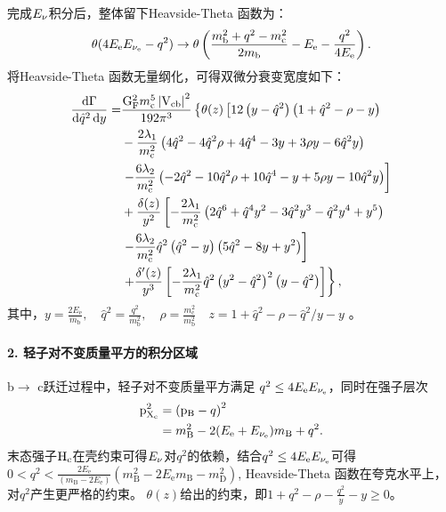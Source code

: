完成$E_{\mathrm{\nu}}$积分后，整体留下Heavside-Theta 函数为：
\begin{equation}
    \theta(4 E_{\mathrm{e}} E_{\mathrm{\nu_{e}}} - q^2) \rightarrow \theta\left(\frac{m_{\mathrm{b}}^2 + q^2 - m_{\mathrm{c}}^2}{2 m_{\mathrm{b}}} - E_{\mathrm{e}} - \frac{q^2}{4 E_{\mathrm{e}}}\right).
\end{equation}
将Heavside-Theta 函数无量纲化，可得双微分衰变宽度如下：
\begin{equation}
    \begin{aligned}
    \frac{\mathrm{d} \Gamma}{\mathrm{d} \hat{q}^2 \, \mathrm{d} y} = & \frac{\mathrm{G_F^2}m_{\mathrm{c}}^5 \left| \mathrm{V_{\mathrm{cb}}} \right|^2}{192 \pi^3}\left\{ \theta ( z ) \left[ 12 \left( y - \hat{q}^2 \right) \left( 1 + \hat{q}^2 - \rho - y \right) \right. \right. \\
    & - \frac{2 \lambda_1}{m_{\mathrm{c}}^2} \left( 4 \hat{q}^2 - 4 \hat{q}^2 \rho + 4 \hat{q}^4 - 3 y + 3 \rho y - 6 \hat{q}^2 y \right) \\
    & \left. - \frac{6 \lambda_2}{m_{\mathrm{c}}^2} \left( - 2 \hat{q}^2 - 10 \hat{q}^2 \rho + 10 \hat{q}^4 - y + 5 \rho y - 10 \hat{q}^2 y \right) \right] \\
    & + \frac{\delta(z)}{y^2} \left[ - \frac{2 \lambda_1}{m_{\mathrm{c}}^2} \left( 2 \hat{q}^6 + \hat{q}^4 y^2 - 3 \hat{q}^2 y^3 - \hat{q}^2 y^4 + y^5 \right) \right. \\
    & \left. - \frac{6 \lambda_2}{m_{\mathrm{c}}^2} \hat{q}^2 \left( \hat{q}^2 - y \right) \left( 5 \hat{q}^2 - 8 y + y^2 \right) \right] \\
    & \left. + \frac{\delta^{\prime}(z)}{y^3} \left[ - \frac{2 \lambda_1}{m_{\mathrm{c}}^2} \hat{q}^2 \left( y^2 - \hat{q}^2 \right)^2 \left( y - \hat{q}^2 \right) \right] \right\},
    \end{aligned}
    \end{equation}
其中，$y = \frac{2 E_{\mathrm{e}}}{m_{\mathrm{b}}}, \quad \hat{q}^2 = \frac{q^2}{m_{\mathrm{b}}^2}, \quad \rho = \frac{m_{\mathrm{c}}^2}{m_{\mathrm{b}}^2}\quad z=1+\hat{q}^2-\rho-\hat{q}^2 / y-y$ 。
\paragraph{2. 轻子对不变质量平方的积分区域}
b$\to$ c跃迁过程中，轻子对不变质量平方满足 $q^{2}\leq4E_{\mathrm{e}}E_{\mathrm{\nu_{e}}}$，同时在强子层次
\begin{equation}
    \begin{aligned}
    \mathrm{p}_{\mathrm{X_c}}^2 & = \left(\mathrm{p}_{\mathrm{B}} - q\right)^2 \\
    & = m_{\mathrm{B}}^2 - 2 (E_{\mathrm{e}} + E_{\mathrm{\nu_e}}) m_{\mathrm{B}} + q^2.
    \end{aligned}
    \end{equation}
末态强子$\mathrm{H_{c}}$在壳约束可得$E_{\mathrm{\nu}}$对$q^{2}$的依赖，结合$q^{2}\leq4E_{\mathrm{e}}E_{\mathrm{\nu_{e}}}$可得$0 < q^2 < \frac{2 E_{\mathrm{e}}}{\left(m_{\mathrm{B}} - 2 E_{\mathrm{e}}\right)} \left( m_{\mathrm{B}}^2 - 2 E_{\mathrm{e}} m_{\mathrm{B}} - m_{\mathrm{D}}^2 \right)$,
 Heavside-Theta 函数在夸克水平上，对$q^2$产生更严格的约束。
$\theta(z)$给出的约束，即$1+q^{2}-\rho-\frac{q^2}{y}-y\geq 0$。

